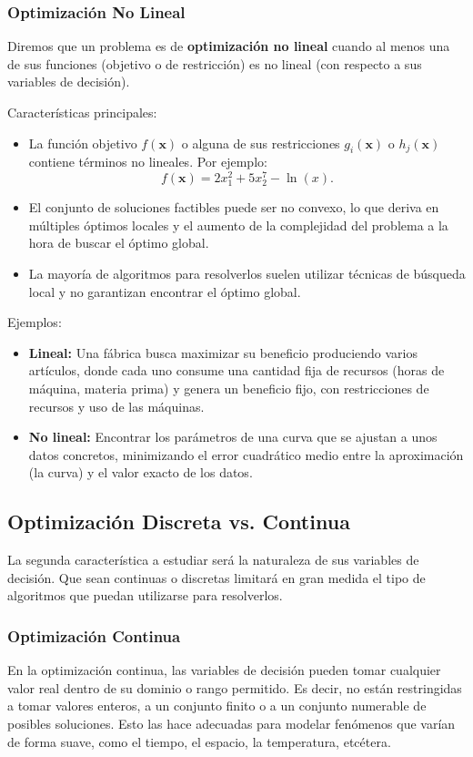 \documentclass[12pt,a4paper]{book}
\begin{document}
\subsubsection{Optimización No Lineal}
Diremos que un problema es de \textbf{optimización no lineal} cuando al menos una de sus funciones (objetivo o de restricción) es no lineal (con respecto a sus variables de decisión). 

Características principales:
\begin{itemize}
    \item La función objetivo $f(\mathbf{x})$ o alguna de sus restricciones $g_i(\mathbf{x})$ o $h_j(\mathbf{x})$ contiene términos no lineales. Por ejemplo:
    $$f(\mathbf{x})=2x_1^2+5x_2^7-\ln(x).$$
    \item El conjunto de soluciones factibles puede ser no convexo, lo que deriva en múltiples óptimos locales y el aumento de la complejidad del problema a la hora de buscar el óptimo global.
    \item La mayoría de algoritmos para resolverlos suelen utilizar técnicas de búsqueda local y no garantizan encontrar el óptimo global.
\end{itemize}

Ejemplos:
\begin{itemize}
    \item \textbf{Lineal:} Una fábrica busca maximizar su beneficio produciendo varios artículos, donde cada uno consume una cantidad fija de recursos (horas de máquina, materia prima) y genera un beneficio fijo, con restricciones de recursos y uso de las máquinas.
    \item \textbf{No lineal:} Encontrar los parámetros de una curva que se ajustan a unos datos concretos, minimizando el error cuadrático medio entre la aproximación (la curva) y el valor exacto de los datos.
\end{itemize}


\subsection{Optimización Discreta vs. Continua}
La segunda característica a estudiar será la naturaleza de sus variables de decisión. Que sean continuas o discretas
limitará en gran medida el tipo de algoritmos que puedan utilizarse para resolverlos.

\subsubsection{Optimización Continua}
En la optimización continua, las variables de decisión pueden tomar cualquier valor real dentro de su dominio o rango permitido. Es decir, no están restringidas a tomar valores enteros, a un conjunto finito o a un conjunto numerable de posibles soluciones. Esto las hace adecuadas para modelar fenómenos que varían de forma suave, como el tiempo, el espacio, la temperatura, etcétera.
\end{document}

